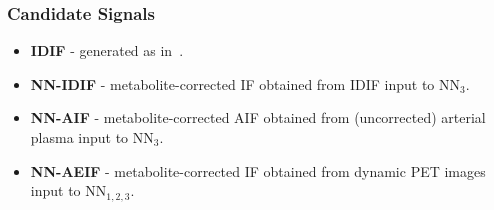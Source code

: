         \subsubsection*{Candidate Signals} \label{sec:candidates}
            \begin{itemize}
                \item \textbf{\gls{IDIF}} - generated as in~.
                
                \item \textbf{\gls{NN}-\gls{IDIF}} - metabolite-corrected \gls{IF} obtained from \gls{IDIF} input to \gls{NN}$_3$.
                
                \item \textbf{\gls{NN}-\gls{AIF}} - metabolite-corrected \gls{AIF} obtained from (uncorrected) arterial plasma input to \gls{NN}$_3$.
                
                \item \textbf{\gls{NN}-\gls{AE}\gls{IF}} - metabolite-corrected \gls{IF} obtained from dynamic \gls{PET} images input to \gls{NN}$_{1,2,3}$.
            \end{itemize}
